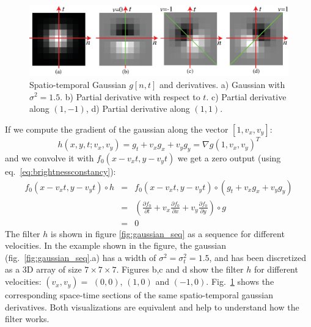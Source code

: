 \begin{figure}
    \includegraphics[width=1\linewidth]{figures/temporal_filters/gaussians_xyt_section.eps}
    \caption{Spatio-temporal Gaussian $g\left[ n,t \right]$ and derivatives. a) Gaussian with $\sigma^2=1.5$. b) Partial derivative with respect to $t$. c) Partial derivative along $(1,-1)$, d) Partial derivative along $(1,1)$.}
    \label{fig:gaussian_xyt_section}
\end{figure}

If we compute the gradient of the gaussian along the vector $\left[1,v_x,v_y\right]$:
\begin{equation}
    h(x,y,t;v_x,v_y) = g_t+v_xg_x+v_yg_y = \nabla  g \left( 1,v_x,v_y \right)^T
\end{equation}
and we convolve it with $f_0 (x-v_xt,y-v_yt)$ we get a zero output (using eq.~\ref{eq:brightnessconstancy}):
\begin{eqnarray}
    f_0 (x-v_xt,y-v_yt) \circ h &=& f_0 (x-v_xt,y-v_yt) \circ \left(  g_t+v_xg_x+v_yg_y \right) \\
    &=& \left( \frac{\partial f_0}{\partial t} + v_x \frac{\partial f_0}{\partial x} + v_y \frac{\partial f_0}{\partial y} \right) \circ g \\
    &=& 0
\end{eqnarray}
The filter $h$ is shown in figure \ref{fig:gaussian_seq} as a sequence for different velocities. In the example shown in the figure, the gaussian (fig.~\ref{fig:gaussian_seq}.a) has a width of $\sigma^2=\sigma_t^2=1.5$, and has been discretized as a 3D array of size $7 \times 7 \times 7$. Figures b,c and d  show the filter $h$ for different velocities: $(v_x,v_y) =$ $(0,0)$, $(1,0)$ and $(-1,0)$. Fig.~\ref{fig:gaussian_xyt_section} shows the corresponding space-time sections of the same spatio-temporal gaussian derivatives. Both visualizations are equivalent and help to understand how the filter works.
%


